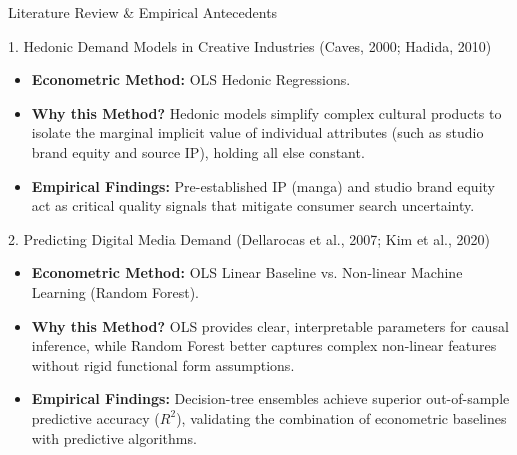 \documentclass[aspectratio=169,11pt]{beamer}
\begin{document}
\begin{frame}{Literature Review \& Empirical Antecedents}
  \footnotesize
  \begin{block}{1. Hedonic Demand Models in Creative Industries (Caves, 2000; Hadida, 2010)}
    \begin{itemize}
      \item \textbf{Econometric Method:} OLS Hedonic Regressions.
      \item \textbf{Why this Method?} Hedonic models simplify complex cultural
        products to isolate the marginal implicit value of individual
        attributes (such as studio brand equity and source IP), holding all
        else constant.
      \item \textbf{Empirical Findings:} Pre-established IP (manga) and studio
        brand equity act as critical quality signals that mitigate consumer
        search uncertainty.
    \end{itemize}
  \end{block}
  \begin{block}{2. Predicting Digital Media Demand (Dellarocas et al., 2007; Kim et al., 2020)}
    \begin{itemize}
      \item \textbf{Econometric Method:} OLS Linear Baseline vs. Non-linear
        Machine Learning (Random Forest).
      \item \textbf{Why this Method?} OLS provides clear, interpretable
        parameters for causal inference, while Random Forest better captures
        complex non-linear features without rigid functional form assumptions.
      \item \textbf{Empirical Findings:} Decision-tree ensembles achieve
        superior out-of-sample predictive accuracy ($R^2$), validating the
        combination of econometric baselines with predictive algorithms.
    \end{itemize}
  \end{block}
\end{frame}
\end{document}
